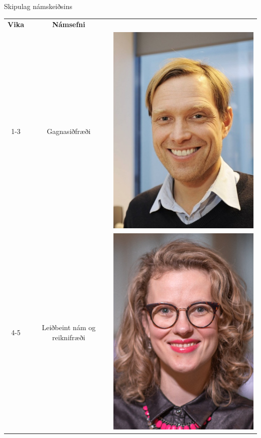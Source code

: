 \documentclass[
    NAME={Dr. Helga Ingimundardóttir},
    EMAIL={helgaingim@hi.is},
    FACULTY={Iðnaðarverkfræði},
    TITLE={Hagnýt hæfni í brennidepli},
    SUBTITLE={Endurskoðun á námskeiði í Viðskiptagreind},
    SEMINAR={Ráðstefna kennsluakademíunnar},
    DATE={22 nóvember, 2024},
    WIDE={true},
    ICELANDIC={true}
]{HI-LaTeX/hi-beamer}
\begin{document}
\begin{frame}{Skipulag námskeiðsins}
    \begin{table}
        \begin{tabular}{ccc}
            \textbf{Vika} & \textbf{Námsefni} &  \\
            1-3 & Gagnasiðfræði & \includegraphics[height=.08\textheight]{figures/hah}\\
            4-5 & Leiðbeint nám og reiknifræði & \includegraphics[height=.08\textheight]{figures/helgaingim} \\

\end{tabular}
\end{table}
\end{frame}
\end{document}
